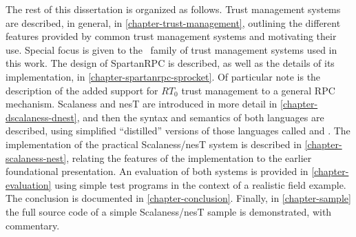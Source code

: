 The rest of this dissertation is organized as follows. Trust management systems are described, in
general, in \autoref{chapter-trust-management}, outlining the different features provided by
common trust management systems and motivating their use. Special focus is given to the \RT\
family of trust management systems used in this work. The design of SpartanRPC is described, as well as the
details of its implementation, in \autoref{chapter-spartanrpc-sprocket}. Of particular note is the description of the added support for $RT_0$ trust management to a general RPC mechanism.
Scalaness and nesT are introduced in more detail in \autoref{chapter-dscalaness-dnest}, and then the
syntax and semantics of both languages are described, using simplified ``distilled'' versions of those
languages called \newterm{DScalaness} and \newterm{DnesT}. The implementation of the
practical Scalaness/nesT system is described in \autoref{chapter-scalaness-nest}, relating the features of the
implementation to the earlier foundational presentation. An evaluation of both systems is provided in
\autoref{chapter-evaluation} using simple test programs in the context of a realistic field
example. The conclusion is documented in \autoref{chapter-conclusion}. Finally, in \autoref{chapter-sample} 
the full source code of a simple Scalaness/nesT sample is demonstrated, with commentary.

